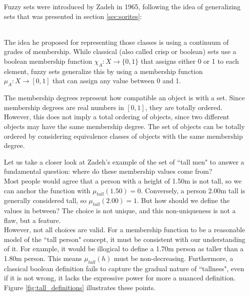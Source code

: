 Fuzzy sets were introduced by Zadeh in 1965, following the idea of generalizing sets that was presented in section \ref{sec:sorites}:

\cite{Zadeh1965}\\

The idea he proposed for representing those classes is using a continuum of grades of membership. While classical (also called crisp or boolean) sets use a boolean membership function $\chi_A:X\rightarrow\{0,1\}$ that assigns either 0 or 1 to each element, fuzzy sets generalize this by using a membership function $\mu_A:X\rightarrow[0,1]$ that can assign any value between 0 and 1. 

\begin{remark}
    The membership degrees represent how compatible an object is with a set. Since membership degrees are real numbers in $[0,1]$, they are totally ordered. However, this does not imply a total ordering of objects, since two different objects may have the same membership degree. The set of objects can be totally ordered by considering equivalence classes of objects with the same membership degree.
\end{remark}

Let us take a closer look at Zadeh's example of the set of ``tall men" to answer a fundamental question: where do these membership values come from?\\

Most people would agree that a person with a height of 1.50m is not tall, so we can anchor the function with $\mu_{tall}(1.50) = 0$. Conversely, a person 2.00m tall is generally considered tall, so $\mu_{tall}(2.00) = 1$. But how should we define the values in between? The choice is not unique, and this non-uniqueness is not a flaw, but a feature.\\

However, not all choices are valid. For a membership function to be a reasonable model of the ``tall person" concept, it must be consistent with our understanding of it. For example, it would be illogical to define a 1.70m person as taller than a 1.80m person. This means $\mu_{tall}(h)$ must be non-decreasing. Furthermore, a classical boolean definition fails to capture the gradual nature of ``tallness", even if it is not wrong, it lacks the expressive power for more a nuanced definition. Figure \ref{fig:tall_definitions} illustrates these points.

